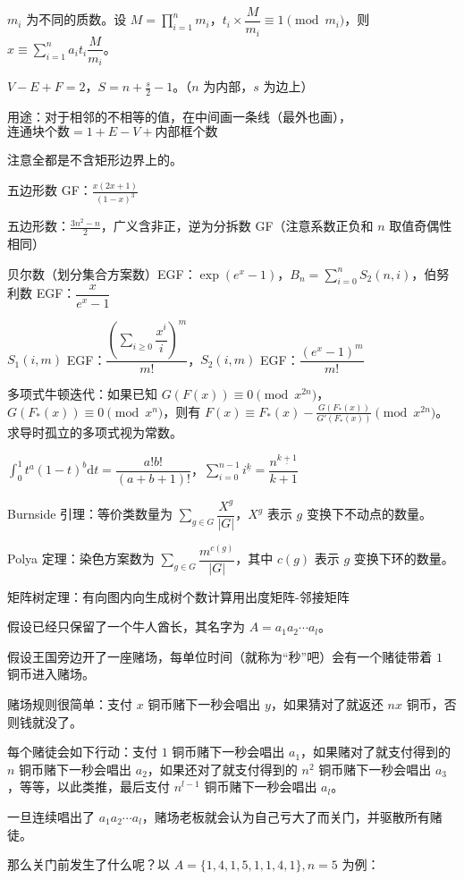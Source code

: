\documentclass[12pt]{ctexart}
\begin{document}
$m_i$ 为不同的质数。设 $M=\prod\limits_{i=1}^nm_i$，$t_i\times \dfrac {M}{m_i}\equiv 1\pmod {m_i}$，则 $x\equiv \sum\limits_{i=1}^na_it_i\dfrac {M}{m_i}$。

$V-E+F=2$，$S=n+\frac s2-1$。（$n$ 为内部，$s$ 为边上）

用途：对于相邻的不相等的值，在中间画一条线（最外也画），$\text{连通块个数}=1+E-V+\text{内部框个数}$

注意全都是不含矩形边界上的。

五边形数 GF：$\frac{x(2x+1)}{(1-x)^3}$

五边形数：$\frac{3n^2-n}2$，广义含非正，逆为分拆数 GF（注意系数正负和 $n$ 取值奇偶性相同）

贝尔数（划分集合方案数）EGF：$\exp(e^x-1)$，$B_n=\sum\limits_{i=0}^n S_2(n,i)$，伯努利数 EGF：$\dfrac{x}{e^x-1}$

$S_1(i,m)$ EGF：$\dfrac{(\sum\limits_{i\ge 0}\dfrac{x^i}i)^m}{m!}$，$S_2(i,m)$ EGF：$\dfrac{(e^x-1)^m}{m!}$

多项式牛顿迭代：如果已知 $G(F(x))\equiv0\pmod{x^{2n}}$，$G(F_*(x))\equiv0\pmod {x^n}$，则有 $F(x)\equiv F_*(x)-\frac{G(F_*(x))}{G'(F_*(x))}\pmod{x^{2n}}$。求导时孤立的多项式视为常数。

$\int_0^1 t^a(1-t)^b\mathrm{d}t=\dfrac{a!b!}{(a+b+1)!}$，$\sum\limits_{i=0}^{n-1}i^{\underline{k}}=\dfrac{n^{\underline{k+1}}}{k+1}$

Burnside 引理：等价类数量为 $\sum\limits_{g\in G}\dfrac{X^g}{|G|}$，$X^g$ 表示 $g$ 变换下不动点的数量。

Polya 定理：染色方案数为 $\sum\limits_{g\in G}\dfrac{m^{c(g)}}{|G|}$，其中 $c(g)$ 表示 $g$ 变换下环的数量。

矩阵树定理：有向图内向生成树个数计算用出度矩阵-邻接矩阵

假设已经只保留了一个牛人酋长，其名字为 $A=a_1a_2\cdots a_l$。

假设王国旁边开了一座赌场，每单位时间（就称为“秒”吧）会有一个赌徒带着 $1$ 铜币进入赌场。

赌场规则很简单：支付 $x$ 铜币赌下一秒会唱出 $y$，如果猜对了就返还 $nx$ 铜币，否则钱就没了。

每个赌徒会如下行动：支付 $1$ 铜币赌下一秒会唱出 $a_1$，如果赌对了就支付得到的 $n$ 铜币赌下一秒会唱出 $a_2$，如果还对了就支付得到的 $n^2$ 铜币赌下一秒会唱出 $a_3$，等等，以此类推，最后支付 $n^{l-1}$ 铜币赌下一秒会唱出 $a_l$。

一旦连续唱出了 $a_1a_2\cdots a_l$，赌场老板就会认为自己亏大了而关门，并驱散所有赌徒。

那么关门前发生了什么呢？以 $A=\{1,4,1,5,1,1,4,1\},n=5$ 为例：
\end{document}
